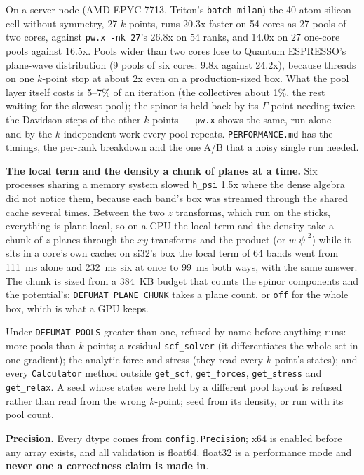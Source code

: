 \documentclass[11pt,a4paper]{article}
\newcommand{\qe}{Quantum ESPRESSO}
\newcommand{\code}[1]{\texttt{\small #1}}
\begin{document}
\noindent On a server node (AMD EPYC 7713, Triton's \code{batch-milan}) the
40-atom silicon cell without symmetry, 27 $k$-points, runs 20.3x faster on 54
cores as 27 pools of two cores, against \code{pw.x -nk 27}'s 26.8x on 54 ranks,
and 14.0x on 27 one-core pools against 16.5x. Pools wider than two cores lose
to \qe's plane-wave distribution (9 pools of six cores: 9.8x against 24.2x),
because threads on one $k$-point stop at about 2x even on a production-sized
box. What the pool layer itself costs is 5--7\% of an iteration (the
collectives about 1\%, the rest waiting for the slowest pool); the spinor is held
back by its $\Gamma$ point needing twice the Davidson steps of the other
$k$-points --- \code{pw.x} shows the same, run alone --- and by the
$k$-independent work every pool repeats. \code{PERFORMANCE.md} has the timings,
the per-rank breakdown and the one A/B that a noisy single run needed.

\textbf{The local term and the density a chunk of planes at a time.} Six processes
sharing a memory system slowed \code{h\_psi} 1.5x where the dense algebra did not
notice them, because each band's box was streamed through the shared cache
several times. Between the two $z$ transforms, which run on the sticks,
everything is plane-local, so on a CPU the local term and the density take a
chunk of $z$ planes through the $xy$ transforms and the product (or
$w|\psi|^2$) while it sits in a core's own cache: on si32's box the local term of
64 bands went from 111~ms alone and 232~ms six at once to 99~ms both ways, with
the same answer. The chunk is sized from a 384~KB budget that counts the spinor
components and the potential's; \code{DEFUMAT\_PLANE\_CHUNK} takes a plane count,
or \code{off} for the whole box, which is what a GPU keeps.

\begin{refuses}
Under \code{DEFUMAT\_POOLS} greater than one, refused by name before anything
runs: more pools than $k$-points; a residual \code{scf\_solver} (it
differentiates the whole set in one gradient); the analytic force and stress
(they read every $k$-point's states); and every \code{Calculator} method outside
\code{get\_scf}, \code{get\_forces}, \code{get\_stress} and \code{get\_relax}.
A seed whose states were held by a different pool layout is refused rather than
read from the wrong $k$-point; seed from its density, or run with its pool count.
\end{refuses}

\textbf{Precision.} Every dtype comes from \code{config.Precision}; x64 is
enabled before any array exists, and all validation is float64. float32 is a
performance mode and \textbf{never one a correctness claim is made in}.
\end{document}
